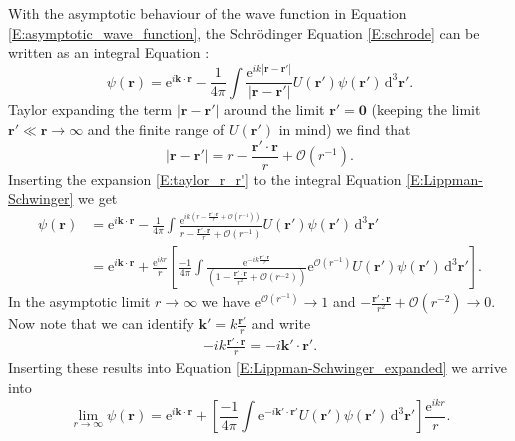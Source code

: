 \documentclass[a4paper, twoside, english, 12pt]{report}
\begin{document}
With the asymptotic behaviour of the wave function in Equation \eqref{E:asymptotic_wave_function}, the Schrödinger Equation \eqref{E:schrode} can be written as an integral Equation \cite[p.424]{griff}:
\begin{equation}\label{E:Lippman-Schwinger}
	\psi(\mathbf{r}) = \text{e}^{i\mathbf{k}\cdot\mathbf{r}} - \frac{1}{4\pi}\int \frac{\text{e}^{ik|\mathbf{r}-\mathbf{r'}|}}{|\mathbf{r}-\mathbf{r'}|}U(\mathbf{r'})\psi(\mathbf{r'})\,\text{d}^3\mathbf{r'}.
\end{equation}
Taylor expanding the term $|\mathbf{r}-\mathbf{r'}|$ around the limit $\mathbf{r'}=\mathbf{0}$ (keeping the limit $\mathbf{r'}\ll \mathbf{r}\rightarrow \infty$ and the finite range of $U(\mathbf{r'})$ in mind) we find that
\begin{equation}\label{E:taylor_r_r'}
	|\mathbf{r}-\mathbf{r'}|=r-\frac{\mathbf{r'}\cdot\mathbf{r}}{r}+\mathcal{O}(r^{-1}).
\end{equation}
Inserting the expansion \eqref{E:taylor_r_r'} to the integral Equation \eqref{E:Lippman-Schwinger} we get
\begin{align}\label{E:Lippman-Schwinger_expanded}
	\psi(\mathbf{r}) &= \text{e}^{i\mathbf{k}\cdot\mathbf{r}} - \frac{1}{4\pi}\int \frac{\text{e}^{ik\left(r-\frac{\mathbf{r'}\cdot\mathbf{r}}{r}+\mathcal{O}(r^{-1})\right)}}{r-\frac{\mathbf{r'}\cdot\mathbf{r}}{r}+\mathcal{O}(r^{-1})}U(\mathbf{r'})\psi(\mathbf{r'})\,\text{d}^3\mathbf{r'} \nonumber \\
	&=\text{e}^{i\mathbf{k}\cdot\mathbf{r}} + \frac{\text{e}^{ikr}}{r}\left[\frac{-1}{4\pi}\int \frac{\text{e}^{-ik\frac{\mathbf{r'}\cdot\mathbf{r}}{r}}}{\left(1-\frac{\mathbf{r'}\cdot\mathbf{r}}{r^2}+\mathcal{O}(r^{-2})\right)}\text{e}^{\mathcal{O}(r^{-1})}U(\mathbf{r'})\psi(\mathbf{r'})\,\text{d}^3\mathbf{r'}\right].
\end{align}
In the asymptotic limit $r\rightarrow\infty$ we have $\text{e}^{\mathcal{O}(r^{-1})}\rightarrow 1$ and $-\frac{\mathbf{r'}\cdot\mathbf{r}}{r^2}+\mathcal{O}(r^{-2})\rightarrow 0$. Now note that we can identify $\mathbf{k'} = k\frac{\mathbf{r'}}{r}$ and write 
\begin{align}
-ik\frac{\mathbf{r'}\cdot\mathbf{r}}{r} = -i\mathbf{k'}\cdot\mathbf{r'} \nonumber.
\end{align}
Inserting these results into Equation \eqref{E:Lippman-Schwinger_expanded} we arrive into
\begin{equation}\label{E:asymptotic_limit_of_L-S}
	\lim\limits_{r\rightarrow\infty} \psi(\mathbf{r}) = \text{e}^{i\mathbf{k}\cdot\mathbf{r}} + \left[\frac{-1}{4\pi}\int \text{e}^{-i\mathbf{k'}\cdot\mathbf{r'}}U(\mathbf{r'})\psi(\mathbf{r'})\,\text{d}^3\mathbf{r'}\right]\frac{\text{e}^{ikr}}{r}.
\end{equation}
\end{document}
